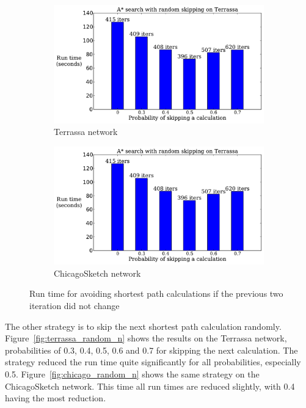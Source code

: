 \begin{figure}[H]
    \centering
    \begin{subfigure}{.5\textwidth}
        \centering
        \includegraphics[page=3,width=\textwidth]{img/random_time}
        \caption{Terrassa network}
        \label{fig:terrassa_skip_n}
    \end{subfigure}%
    \begin{subfigure}{.5\textwidth}
        \centering
        \includegraphics[page=4,width=\textwidth]{img/random_time}
        \caption{ChicagoSketch network}
        \label{fig:chicago_skip_n}
    \end{subfigure}
    \caption{Run time for avoiding shortest path calculations if the previous two iteration did not change}
    \label{fig:skip_n}
\end{figure}

The other strategy is to skip the next shortest path calculation randomly.
Figure~\ref{fig:terrassa_random_n} shows the results on the Terrassa network, probabilities of 0.3, 0.4, 0.5, 0.6 and 0.7 for skipping the next calculation.
The strategy reduced the run time quite significantly for all probabilities,
especially 0.5.
Figure~\ref{fig:chicago_random_n} shows the same strategy on the ChicagoSketch network.
This time all run times are reduced slightly, with 0.4 having the most reduction.

